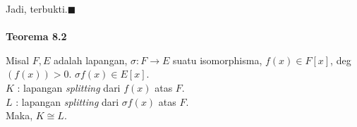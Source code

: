 	Jadi, terbukti.$\blacksquare$
\\
\\
	\textbf{Teorema 8.2}
\par	Misal $F,E$ adalah lapangan, $\sigma : F \longrightarrow E$ suatu isomorphisma, $f(x) \in F[x]$, deg$(f(x))>0$. $\sigma f(x) \in E[x]$.\\
	$K$ : lapangan \textit{splitting} dari $f(x)$ atas $F$.\\
	$L$ : lapangan \textit{splitting} dari $\sigma f(x)$ atas $F$.\\
	Maka, $K\cong L.$